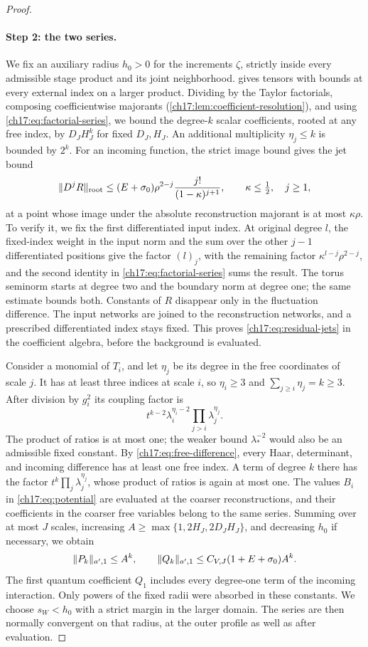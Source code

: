 \begin{proof}
\paragraph{Step 2: the two series.}
We fix an auxiliary radius $h_0>0$ for the increments $\zeta$, strictly inside every admissible stage product and its joint neighborhood.  gives tensors with bounds at every external index on a larger product. Dividing by the Taylor factorials, composing coefficientwise majorants (\cref{ch17:lem:coefficient-resolution}), and using \eqref{ch17:eq:factorial-series}, we bound the degree-$k$ scalar coefficients, rooted at any free index, by $D_JH_J^k$ for fixed $D_J,H_J$. An additional multiplicity $\eta_j\le k$ is bounded by $2^k$. For an incoming function, the strict image bound gives the jet bound
\begin{equation}\label{ch17:eq:residual-jets}
 \lVert D^jR\rVert_{\mathrm{root}}\le(E+\sigma_0)\rho^{2-j}\frac{j!}{(1-\kappa)^{j+1}},\qquad\kappa\le\tfrac12,\quad j\ge1,
\end{equation}
at a point whose image under the absolute reconstruction majorant is at most $\kappa\rho$. To verify it, we fix the first differentiated input index. At original degree $l$, the fixed-index weight in the input norm and the sum over the other $j-1$ differentiated positions give the factor $(l)_j$, with the remaining factor $\kappa^{l-j}\rho^{2-j}$, and the second identity in \eqref{ch17:eq:factorial-series} sums the result. The torus seminorm starts at degree two and the boundary norm at degree one; the same estimate bounds both. Constants of $R$ disappear only in the fluctuation difference. The input networks are joined to the reconstruction networks, and a prescribed differentiated index stays fixed. This proves \eqref{ch17:eq:residual-jets} in the coefficient algebra, before the background is evaluated.

Consider a monomial of $T_i$, and let $\eta_j$ be its degree in the free coordinates of scale $j$. It has at least three indices at scale $i$, so $\eta_i\ge3$ and $\sum_{j\ge i}\eta_j=k\ge3$. After division by $g_i^2$ its coupling factor is
\[
 t^{k-2}\lambda_i^{\eta_i-2}\prod_{j>i}\lambda_j^{\eta_j}.
\]
The product of ratios is at most one; the weaker bound $\lambda_*^{-2}$ would also be an admissible fixed constant. By \eqref{ch17:eq:free-difference}, every Haar, determinant, and incoming difference has at least one free index. A term of degree $k$ there has the factor $t^k\prod_j\lambda_j^{\eta_j}$, whose product of ratios is again at most one. The values $B_i$ in \eqref{ch17:eq:potential} are evaluated at the coarser reconstructions, and their coefficients in the coarser free variables belong to the same series. Summing over at most $J$ scales, increasing $A\ge\max\{1,2H_J,2D_JH_J\}$, and decreasing $h_0$ if necessary, we obtain
\[
 \lVert P_k\rVert_{a',1}\le A^k,\qquad\lVert Q_k\rVert_{a',1}\le C_{V,J}(1+E+\sigma_0)A^k.
\]
The first quantum coefficient $Q_1$ includes every degree-one term of the incoming interaction. Only powers of the fixed radii were absorbed in these constants. We choose $s_W<h_0$ with a strict margin in the larger domain. The series are then normally convergent on that radius, at the outer profile as well as after evaluation.


\end{proof}
